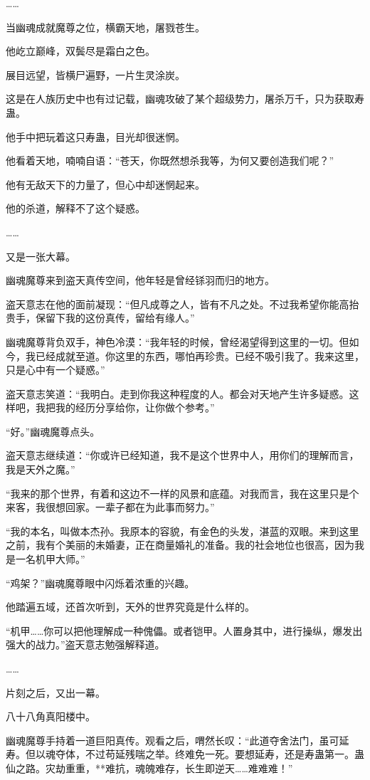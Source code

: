 \begin{this_body}
……

当幽魂成就魔尊之位，横霸天地，屠戮苍生。

他屹立巅峰，双鬓尽是霜白之色。

展目远望，皆横尸遍野，一片生灵涂炭。

这是在人族历史中也有过记载，幽魂攻破了某个超级势力，屠杀万千，只为获取寿蛊。

他手中把玩着这只寿蛊，目光却很迷惘。

他看着天地，喃喃自语：“苍天，你既然想杀我等，为何又要创造我们呢？”

他有无敌天下的力量了，但心中却迷惘起来。

他的杀道，解释不了这个疑惑。

……

又是一张大幕。

幽魂魔尊来到盗天真传空间，他年轻是曾经铩羽而归的地方。

盗天意志在他的面前凝现：“但凡成尊之人，皆有不凡之处。不过我希望你能高抬贵手，保留下我的这份真传，留给有缘人。”

幽魂魔尊背负双手，神色冷漠：“我年轻的时候，曾经渴望得到这里的一切。但如今，我已经成就至道。你这里的东西，哪怕再珍贵。已经不吸引我了。我来这里，只是心中有一个疑惑。”

盗天意志笑道：“我明白。走到你我这种程度的人。都会对天地产生许多疑惑。这样吧，我把我的经历分享给你，让你做个参考。”

“好。”幽魂魔尊点头。

盗天意志继续道：“你或许已经知道，我不是这个世界中人，用你们的理解而言，我是天外之魔。”

“我来的那个世界，有着和这边不一样的风景和底蕴。对我而言，我在这里只是个来客，我很想回家。一辈子都在为此事而努力。”

“我的本名，叫做本杰孙。我原本的容貌，有金色的头发，湛蓝的双眼。来到这里之前，我有个美丽的未婚妻，正在商量婚礼的准备。我的社会地位也很高，因为我是一名机甲大师。”

“鸡架？”幽魂魔尊眼中闪烁着浓重的兴趣。

他踏遍五域，还首次听到，天外的世界究竟是什么样的。

“机甲……你可以把他理解成一种傀儡。或者铠甲。人置身其中，进行操纵，爆发出强大的战力。”盗天意志勉强解释道。

……

片刻之后，又出一幕。

八十八角真阳楼中。

幽魂魔尊手持着一道巨阳真传。观看之后，喟然长叹：“此道夺舍法门，虽可延寿。但以魂夺体，不过苟延残喘之举。终难免一死。要想延寿，还是寿蛊第一。蛊仙之路。灾劫重重，**难抗，魂魄难存，长生即逆天……难难难！”


\end{this_body}
